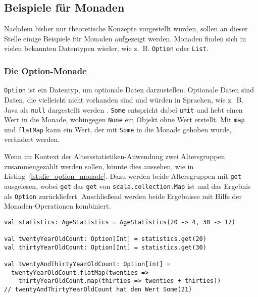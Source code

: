 
\subsection{Beispiele für Monaden} %
\label{sub:beispiele_fuer_monaden}

Nachdem bisher nur theoretische Konzepte vorgestellt wurden, sollen an dieser Stelle einige Beispiele für Monaden aufgezeigt werden.
Monaden finden sich in vielen bekannten Datentypen wieder, wie z.~B. \lstinline|Option| oder \lstinline|List|.

\subsubsection{Die Option-Monade} %
\label{ssub:die_option_monade}

\lstinline|Option| ist ein Datentyp, um optionale Daten darzustellen.
Optionale Daten sind Daten, die vielleicht nicht vorhanden sind und würden in Sprachen, wie z.~B. Java als \lstinline|null| dargestellt werden \cite[vgl.][S.~329]{programming_in_scala}.
\lstinline|Some| entspricht dabei \lstinline|unit| und hebt einen Wert in die Monade, wohingegen \lstinline|None| ein Objekt ohne Wert erstellt.
Mit \lstinline|map| und \lstinline|flatMap| kann ein Wert, der mit \lstinline|Some| in die Monade gehoben wurde, verändert werden.

Wenn im Kontext der Altersstatistiken-Anwendung zwei Altersgruppen zusammengezählt werden sollen, könnte dies aussehen, wie in Listing~\ref{lst:die_option_monade}.
Dazu werden beide Altersgruppen mit \lstinline|get| ausgelesen, wobei \lstinline|get| das \lstinline|get| von \lstinline|scala.collection.Map| ist und das Ergebnis als \lstinline|Option| zurückliefert.
Anschließend werden beide Ergebnisse mit Hilfe der Monaden-Operationen kombiniert.

\begin{lstlisting}[caption=Die Option-Monade, label=lst:die_option_monade]
val statistics: AgeStatistics = AgeStatistics(20 -> 4, 30 -> 17)

val twentyYearOldCount: Option[Int] = statistics.get(20)
val thirtyYearOldCount: Option[Int] = statistics.get(30)

val twentyAndThirtyYearOldCount: Option[Int] =
  twentyYearOldCount.flatMap(twenties =>
    thirtyYearOldCount.map(thirties => twenties + thirties))
// twentyAndThirtyYearOldCount hat den Wert Some(21)
\end{lstlisting}

